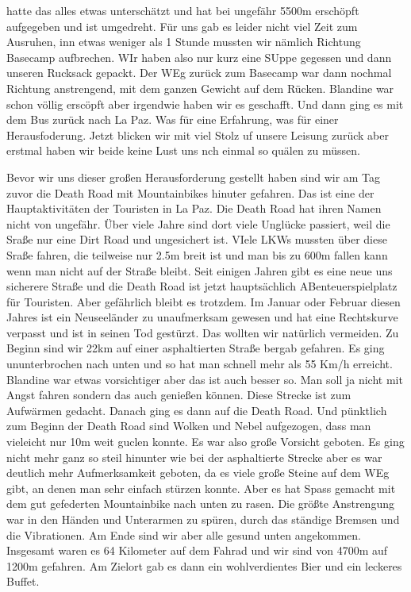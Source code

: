 \documentclass[11pt]{book}
\begin{document}
hatte das alles etwas unterschätzt und hat bei ungefähr 5500m erschöpft aufgegeben und ist umgedreht. Für uns gab es leider nicht viel Zeit zum Ausruhen, 
inn etwas weniger als 1 Stunde mussten wir nämlich Richtung Basecamp aufbrechen. WIr haben also nur kurz eine SUppe gegessen und dann unseren Rucksack 
gepackt. Der WEg zurück zum Basecamp war dann nochmal Richtung anstrengend, mit dem ganzen Gewicht auf dem Rücken. Blandine war schon völlig erscöpft 
aber irgendwie haben wir es geschafft. Und dann ging es mit dem Bus zurück nach La Paz. Was für eine Erfahrung, was für einer Herausfoderung. Jetzt blicken 
wir mit viel Stolz uf unsere Leisung zurück aber erstmal haben wir beide keine Lust uns nch einmal so quälen zu müssen. 

Bevor wir uns dieser großen Herausforderung gestellt haben sind wir am Tag zuvor die Death Road mit Mountainbikes hinuter gefahren. Das ist eine der
Hauptaktivitäten der Touristen in La Paz. Die Death Road hat ihren Namen nicht von ungefähr. Über viele Jahre sind dort viele Unglücke passiert, weil 
die Sraße nur eine Dirt Road  und ungesichert ist. VIele LKWs mussten über diese Sraße fahren, die teilweise nur 2.5m breit ist und man bis zu 600m 
fallen kann wenn man nicht auf der Straße bleibt. Seit einigen Jahren gibt es eine neue uns sicherere Straße und die Death Road ist jetzt hauptsächlich 
ABenteuerspielplatz für Touristen. Aber gefährlich bleibt es trotzdem. Im Januar oder Februar diesen Jahres ist ein Neuseeländer zu unaufmerksam gewesen 
und hat eine Rechtskurve verpasst und ist in seinen Tod gestürzt. Das wollten wir natürlich vermeiden. Zu Beginn sind wir 22km auf einer asphaltierten 
Straße bergab gefahren. Es ging ununterbrochen nach unten und so hat man schnell mehr als 55 Km/h erreicht. Blandine war etwas vorsichtiger aber das ist 
auch besser so. Man soll ja nicht mit Angst fahren sondern das auch genießen können. Diese Strecke ist zum Aufwärmen gedacht. Danach ging es dann auf die 
Death Road. Und pünktlich zum Beginn der Death Road sind Wolken und Nebel aufgezogen, dass man vieleicht nur 10m weit guclen konnte. Es war also große 
Vorsicht geboten. Es ging nicht mehr ganz so steil hinunter wie bei der asphaltierte Strecke aber es war deutlich mehr Aufmerksamkeit geboten, da es 
viele große Steine auf dem WEg gibt, an denen man sehr einfach stürzen konnte. Aber es hat Spass gemacht mit dem gut gefederten Mountainbike nach unten 
zu rasen. Die größte Anstrengung war in den Händen und Unterarmen zu spüren, durch das ständige Bremsen und die Vibrationen. Am Ende sind wir aber alle gesund 
unten angekommen. Insgesamt waren es 64 Kilometer auf dem Fahrad und wir sind von 4700m auf 1200m gefahren. Am Zielort gab es dann ein wohlverdientes 
Bier und ein leckeres Buffet.
\end{document}
